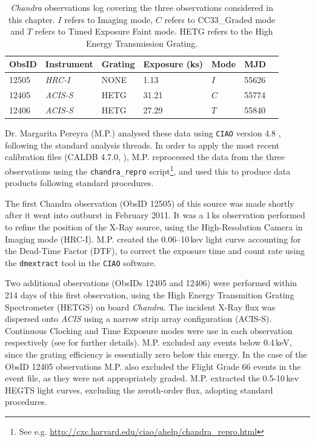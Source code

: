 \begin{table}
\centering
\begin{tabular}{lllllll}
\hline
\hline
\scriptsize ObsID &\scriptsize  Instrument &\scriptsize Grating &\scriptsize Exposure (ks) &\scriptsize Mode &\scriptsize MJD\\
\hline
12505  	& \textit{HRC-I}    &   NONE      &    1.13      & $I$ & 55626\\
12405  	& \textit{ACIS-S} &   HETG     &    31.21     & $C$ & 55774\\
12406  	& \textit{ACIS-S} &   HETG     &    27.29     & $T$ & 55840\\
\hline
\hline
\end{tabular}
\caption[\textit{Chandra} observations log covering the three observations considered in Chapter \ref{ch:IGR}.]{\textit{Chandra} observations log covering the three observations considered in this chapter.  $I$ refers to Imaging mode, $C$ refers to CC33\_Graded mode and $T$ refers to Timed Exposure Faint mode.  HETG refers to the High Energy Transmission Grating.}
\label{tab:Chandra}
\end{table}

\par Dr. Margarita Pereyra (\textsf{M.P.}) analysed these data using \texttt{CIAO} version 4.8 \citep{Fruscione_Ciao}, following the standard analysis threads. In order to apply the most recent calibration files (CALDB 4.7.0, \citealp{Graessle_ChaCALDB}), \textsf{M.P.} reprocessed the data from the three observations using the \texttt{chandra\_repro} script\footnote{See e.g. \url{http://cxc.harvard.edu/ciao/ahelp/chandra_repro.html}}, and used this to produce data products following standard procedures.
\par The first Chandra observation (ObsID 12505) of this source was made shortly after it went into outburst in February 2011. It was a 1\,ks observation performed to refine the position of the X-Ray source, using the High-Resolution Camera in Imaging mode (HRC-I). \textsf{M.P.} created the 0.06--10\,kev light curve accounting for the Dead-Time Factor (DTF), to correct the exposure time and count rate using the \texttt{dmextract} tool in the \texttt{CIAO} software.
\par Two additional observations (ObsIDs 12405 and 12406) were performed within 214 days of this first observation, using the High Energy Transmition Grating Spectrometer (HETGS) on board \textit{Chandra}. The incident X-Ray flux was dispersed onto \indexacis\textit{ACIS} using a narrow strip array configuration (ACIS-S). Continuous Clocking and Time Exposure modes were use in each observation respectively (see \citealp{King_IGRWinds} for further details). \textsf{M.P.} excluded any events below 0.4\,keV, since the grating efficiency is essentially zero below this energy. In the case of the ObsID 12405 observations \textsf{M.P.} also excluded the Flight Grade 66 events in the event file, as they were not appropriately graded. \textsf{M.P.} extracted the 0.5-10\,kev HEGTS light curves, excluding the zeroth-order flux, adopting standard procedures.

